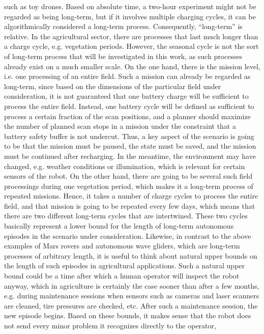 \documentclass[english, master, utf8]{base/thesis_KBS}
\begin{document}
such as toy drones. Based on absolute time, a two-hour experiment might not be regarded as being long-term, but if it involves multiple charging cycles, it can be 
algorithmically considered a long-term process. Consequently, ``long-term'' is relative.\newline
In the agricultural sector, there are processes that last much longer than a charge cycle, e.g. vegetation periods.
However, the seasonal cycle is not the sort of long-term process that will be investigated in this work, as such processes already exist on a much smaller scale.
On the one hand, there is the mission level, i.e. one processing of an entire field. 
Such a mission can already be regarded as long-term, since based on the dimensions of the particular field under consideration, it is not guaranteed that one
battery charge will be sufficient to process the entire field. Instead, one battery cycle will be defined as sufficient to process a certain fraction of the scan
positions, and a planner should maximize the number of planned scan stops in a mission under the constraint that a battery safety buffer is not undercut.
Thus, a key aspect of the scenario is going to be that the mission must be paused, the state must be saved, and the mission must be continued after recharging.
In the meantime, the environment may have changed, e.g. weather conditions or illumination, which is relevant for certain sensors of the robot.
On the other hand, there are going to be several such field processings during one vegetation period, which makes it a long-term process of repeated missions.
Hence, it takes a number of charge cycles to process the entire field, and that mission is going to be repeated every few days,
which means that there are two different long-term cycles that are intertwined.
These two cycles basically represent a lower bound for the length of long-term autonomous episodes in the scenario under
consideration. Likewise, in contrast to the above examples of Mars rovers and autonomous wave gliders, which are long-term
processes of arbitrary length, it is useful to think about natural upper bounds on the length of such episodes in agricultural
applications. Such a natural upper bound could be a time after which a human operator will inspect the robot anyway,
which in agriculture is certainly the case sooner than after a few months, e.g. during maintenance sessions 
when sensors such as cameras and laser scanners are cleaned, tire pressures are checked, etc.
After such a maintenance session, the new episode begins. 
Based on these bounds, it makes sense that the robot does not send every minor problem it recognizes directly to the operator,
\end{document}
